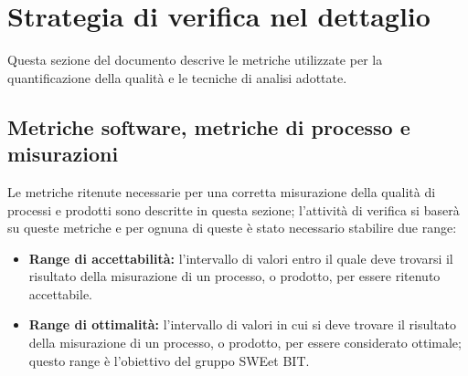 \section{Strategia di verifica nel dettaglio}
  Questa sezione del documento descrive le metriche utilizzate per la quantificazione della qualità e le tecniche di analisi adottate.

  \subsection{Metriche software, metriche di processo e misurazioni}
  Le metriche ritenute necessarie per una corretta misurazione della qualità di processi e prodotti sono descritte in questa sezione;
  l'attività di verifica si baserà su queste metriche e per ognuna di queste è stato necessario stabilire due range:
  \begin{itemize}
    \item \textbf{Range di accettabilità:} l'intervallo di valori entro il quale deve trovarsi il risultato della misurazione di un processo, o prodotto, per essere ritenuto accettabile.
    \item \textbf{Range di ottimalità:} l'intervallo di valori in cui si deve trovare il risultato della misurazione di un processo, o prodotto, per essere considerato ottimale;
    questo range è l'obiettivo del gruppo SWEet BIT.
  \end{itemize}
